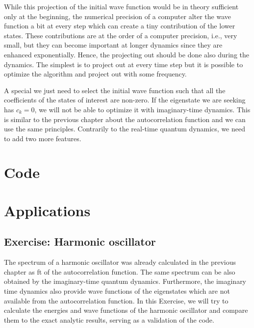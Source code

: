 While this projection of the initial wave function would be in theory sufficient only at the beginning, the numerical precision of a computer alter the wave function a bit at every step which can create a tiny contribution of the lower states. These contributions are at the order of a computer precision, i.e., very small, but they can become important at longer dynamics since they are enhanced exponentially. Hence, the projecting out should be done also during the dynamics. The simplest is to project out at every time step but it is possible to optimize the algorithm and project out with some frequency.

A special  we just need to select the initial wave function such that all the coefficients of the states of interest are non-zero. If the eigenstate we are seeking has $c_k=0$, we will not be able to optimize it with imaginary-time dynamics. This is similar to the previous chapter about the autocorrelation function and we can use the same principles. Contrarily to the real-time quantum dynamics, we need to add two more features.

\section{Code}

\lstset{style=mystyle}


\section{Applications}

\subsection*{Exercise: Harmonic oscillator}

The spectrum of a harmonic oscillator was already calculated in the previous chapter as \acrlong{ft} of the autocorrelation function. The same spectrum can be also obtained by the imaginary-time quantum dynamics. Furthermore, the imaginary time dynamics also provide wave functions of the eigenstates which are not available from the autocorrelation function. In this Exercise, we will try to calculate the energies and wave functions of the harmonic oscillator and compare them to the exact analytic results, serving as a validation of the code.

